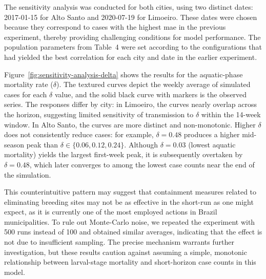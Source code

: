 The sensitivity analysis was conducted for both cities, using two distinct dates: 2017-01-15 for Alto Santo and 2020-07-19 for Limoeiro. These dates were chosen because they correspond to cases with the highest \gls{mae} in the previous experiment, thereby providing challenging conditions for model performance. The population parameters from Table~4 were set according to the configurations that had yielded the best correlation for each city and date in the earlier experiment.

Figure~\ref{fig:sensitivity-analysis-delta} shows the results for the aquatic-phase mortality rate ($\delta$). The textured curves depict the weekly average of simulated cases for each $\delta$ value, and the solid black curve with markers is the observed series. The responses differ by city: in Limoeiro, the curves nearly overlap across the horizon, suggesting limited sensitivity of transmission to $\delta$ within the 14-week window. In Alto Santo, the curves are more distinct and non-monotonic. Higher $\delta$ does not consistently reduce cases: for example, $\delta=0.48$ produces a higher mid-season peak than $\delta \in \{0.06,0.12,0.24\}$. Although $\delta=0.03$ (lowest aquatic mortality) yields the largest first-week peak, it is subsequently overtaken by $\delta=0.48$, which later converges to among the lowest case counts near the end of the simulation.

This counterintuitive pattern may suggest that containment measures related to eliminating breeding sites may not be as effective in the short-run as one might expect, as it is currently one of the most employed actions in Brazil municipalities. To rule out Monte-Carlo noise, we repeated the experiment with 500 runs instead of 100 and obtained similar averages, indicating that the effect is not due to insufficient sampling. The precise mechanism warrants further investigation, but these results caution against assuming a simple, monotonic relationship between larval-stage mortality and short-horizon case counts in this model.


